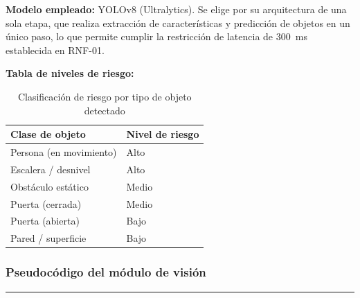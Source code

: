 \textbf{Modelo empleado:} YOLOv8 (Ultralytics). Se elige por su arquitectura de una sola etapa, que realiza extracción de características y predicción de objetos en un único
paso, lo que permite cumplir la restricción de latencia de 300~ms establecida en RNF-01.

\textbf{Tabla de niveles de riesgo:}

\begin{table}[H]
\centering
\begin{tabular}{ll}
\hline
\textbf{Clase de objeto} & \textbf{Nivel de riesgo} \\
\hline
Persona (en movimiento) & Alto \\
Escalera / desnivel     & Alto \\
Obstáculo estático      & Medio \\
Puerta (cerrada)        & Medio \\
Puerta (abierta)        & Bajo \\
Pared / superficie      & Bajo \\
\hline
\end{tabular}
\caption{Clasificación de riesgo por tipo de objeto detectado}
\label{tabla_riesgo}
\end{table}

\subsubsection{Pseudocódigo del módulo de visión}

\begin{center}
\label{alg:vision}
\end{center}
\vspace{-1.8cm}
\rule{\textwidth}{0.4pt}
\vspace{-0.9cm}

